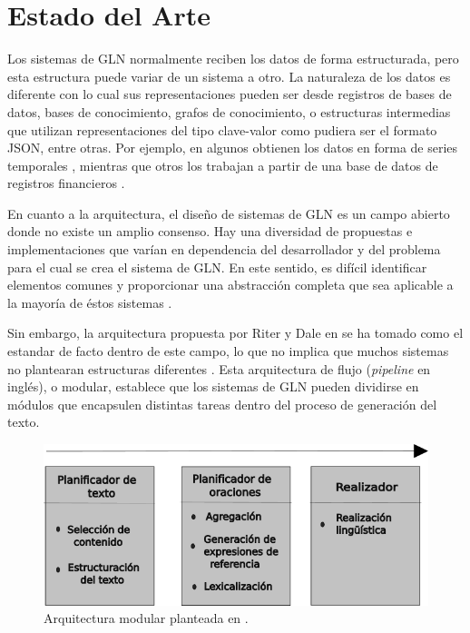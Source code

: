 \chapter{Estado del Arte}\label{chapter:state-of-the-art}


    Los sistemas de GLN normalmente reciben los datos de forma estructurada, pero esta estructura puede variar de un sistema a otro.
La naturaleza de los datos es diferente con lo cual sus representaciones pueden ser desde registros de bases de datos, bases de conocimiento, 
grafos de conocimiento, o estructuras intermedias que utilizan representaciones del tipo clave-valor como pudiera ser el formato JSON, entre otras. 
Por ejemplo, en algunos obtienen los datos en forma de series temporales , mientras que otros los trabajan a 
partir de una base de datos de registros financieros .

En cuanto a la arquitectura, el diseño de sistemas de GLN es un campo abierto donde no existe un amplio consenso. Hay una diversidad de propuestas e implementaciones 
que varían en dependencia del desarrollador y del problema para el cual se crea el sistema de GLN. En este sentido, es difícil identificar elementos comunes y proporcionar una abstracción 
completa que sea aplicable a la mayoría de éstos sistemas .


 Sin embargo, la arquitectura propuesta por Riter y Dale en  se ha tomado como el estandar de facto 
dentro de este campo, lo que no implica que muchos sistemas no plantearan estructuras diferentes . 
Esta arquitectura de flujo (\emph{pipeline} en inglés), o modular, establece que los sistemas de GLN pueden dividirse en módulos 
que encapsulen distintas tareas dentro del proceso de generación del texto.

    

    \begin{figure}[!]
        \begin{center}
            \includegraphics[width=\textwidth]{Graphics/arquitecturaPipeline_Capa 1.png}
        \end{center}
        \caption{Arquitectura modular planteada en .}
        \label{fig_arq_Pipeline}
    \end{figure}


